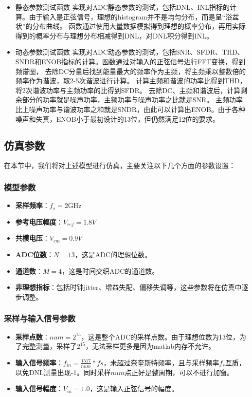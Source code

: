 \documentclass[cs4size,a4paper]{ctexart}
\numberwithin{equation}{section}
\numberwithin{table}{section}
\numberwithin{figure}{section}
\begin{document}
\begin{itemize}
		\item 静态参数测试函数
		实现对ADC静态参数的测试，包括DNL、INL指标的计算。由于输入是正弦信号，理想的histogram并不是均匀分布，而是呈“浴盆状”的分布曲线。
		函数通过使用大量数据模拟得到理想的概率分布，再用实际得到的概率分布与理想分布相减得到DNL，对DNL积分得到INL。

		\item 动态参数测试函数
		实现对ADC动态参数的测试，包括SNR、SFDR、THD、SNDR和ENOB指标的计算。函数通过对输入的正弦信号进行FFT变换，得到频谱图，
		去除DC分量后找到能量最大的频率作为主频，将主频乘以整数倍的频率作为谐波，取2-5次谐波进行计算。
		计算主频和谐波的功率比得到THD，将2次谐波功率与主频功率的比得到SFDR。
		去除DC、主频和谐波后，计算剩余部分的功率就是噪声功率，主频功率与噪声功率之比就是SNR。
		主频功率比上噪声功率与谐波功率之和就是SNDR，由此可以计算出ENOB。由于各种噪声和失真，ENOB小于最初设计的13位，但仍然满足12位的要求。

	\end{itemize}
	\subsection{仿真参数}
	在本节中，我们将对上述模型进行仿真，主要关注以下几个方面的参数设置：
	\subsubsection{模型参数}
	\begin{itemize}
		\item \textbf{采样频率}：$f_s = 2 \text{GHz}$
		\item \textbf{参考电压幅度}：$V_{ref} = 1.8V$
		\item \textbf{共模电压}：$V_{cm} = 0.9V$
		\item \textbf{ADC位数}：$N = 13$，这是ADC的理想位数。
		\item \textbf{通道数}：$M = 4$，这是时间交织ADC的通道数。
		\item \textbf{非理想指标}：包括时钟jitter、增益失配、偏移失调等，这些参数将在仿真中逐步调整。
	\end{itemize}

	\subsubsection{采样与输入信号参数}
	\begin{itemize}
		\item \textbf{采样点数}：$num = 2^{15}$，这是整个ADC的采样点数。由于理想位数为13位，为了完整测量，采样了$2^{15}$，无法采样更多是因为matlab内存不允许。
		\item \textbf{输入信号频率}：$f_{in} = \frac{1517}{num} * fs$，未超过奈奎斯特频率，且与采样频率$f_s$互质，以免DNL测量出现-1。同时采样$num$点正好是整周期，可以不进行加窗。
		\item \textbf{输入信号幅度}：$V_{in} = 1.0$，这是输入正弦信号的幅度。
	\end{itemize}
\end{document}
